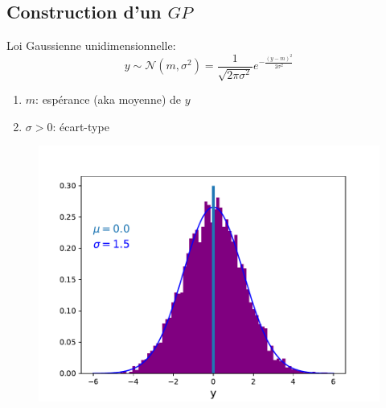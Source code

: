 \documentclass[xcolor=svgnames, t]{beamer}
\begin{document}
\subsection{Construction d'un $GP$}
\begin{frame}{\subsecname}
  
% 
  Loi Gaussienne unidimensionnelle:
  \begin{equation*}
    y \sim \mathcal{N}(m, \sigma^2) = \frac{1}{\sqrt{2 \pi \sigma^2}} e^{-\frac{(y-m)^2}{2 \sigma^2}}
  \end{equation*}

  \begin{enumerate}
    \item $m$: espérance (aka moyenne) de $y$
    \item $\sigma > 0$: écart-type
  \end{enumerate}


  \begin{figure}
    \includegraphics[scale=0.4]{gaussian_1d.pdf}
  \end{figure}
\end{frame}
\end{document}
